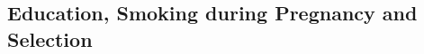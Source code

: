 \documentclass[a4paper, 11.5 pt]{article}
\theoremstyle{plain}
\begin{document}
\begin{doublespace}
\vspace{10mm}
\vspace{10mm}
\vspace{10mm}
\vspace{10mm}
\vspace{10mm}
\vspace{10mm}


\subsection{Education, Smoking during Pregnancy and Selection}





\end{doublespace}
\end{document}
